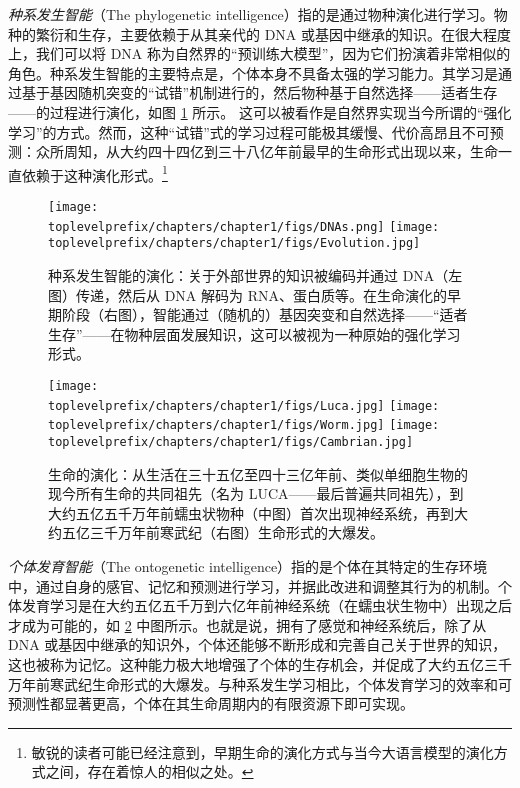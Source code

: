 \documentclass[../../book-main.tex]{subfiles}
\begin{document}
{\em 种系发生智能}（The phylogenetic intelligence）指的是通过物种演化进行学习。物种的繁衍和生存，主要依赖于从其亲代的 DNA 或基因中继承的知识。在很大程度上，我们可以将 DNA 称为自然界的“预训练大模型”，因为它们扮演着非常相似的角色。种系发生智能的主要特点是，个体本身不具备太强的学习能力。其学习是通过基于基因随机突变的“试错”机制进行的，然后物种基于自然选择——适者生存——的过程进行演化，如图 \ref{fig:phylogenetic} 所示。
这可以被看作是自然界实现当今所谓的“强化学习”的方式。然而，这种“试错”式的学习过程可能极其缓慢、代价高昂且不可预测：众所周知，从大约四十四亿到三十八亿年前最早的生命形式出现以来，生命一直依赖于这种演化形式。\footnote{敏锐的读者可能已经注意到，早期生命的演化方式与当今大语言模型的演化方式之间，存在着惊人的相似之处。} 
\begin{figure}
    \centering
\texttt{[image: \\toplevelprefix/chapters/chapter1/figs/DNAs.png]}
\texttt{[image: \\toplevelprefix/chapters/chapter1/figs/Evolution.jpg]}
    \caption{种系发生智能的演化：关于外部世界的知识被编码并通过 DNA（左图）传递，然后从 DNA 解码为 RNA、蛋白质等。在生命演化的早期阶段（右图），智能通过（随机的）基因突变和自然选择——“适者生存”——在物种层面发展知识，这可以被视为一种原始的强化学习形式。}
    \label{fig:phylogenetic}
\end{figure}
\begin{figure}
    \centering
\texttt{[image: \\toplevelprefix/chapters/chapter1/figs/Luca.jpg]}
\texttt{[image: \\toplevelprefix/chapters/chapter1/figs/Worm.jpg]}
\texttt{[image: \\toplevelprefix/chapters/chapter1/figs/Cambrian.jpg]}
    \caption{生命的演化：从生活在三十五亿至四十三亿年前、类似单细胞生物的现今所有生命的共同祖先（名为 LUCA——最后普遍共同祖先），到大约五亿五千万年前蠕虫状物种（中图）首次出现神经系统，再到大约五亿三千万年前寒武纪（右图）生命形式的大爆发。}
    \label{fig:evolution}
\end{figure}

{\em 个体发育智能}（The ontogenetic intelligence）指的是个体在其特定的生存环境中，通过自身的感官、记忆和预测进行学习，并据此改进和调整其行为的机制。个体发育学习是在大约五亿五千万到六亿年前神经系统（在蠕虫状生物中）出现之后才成为可能的，如 \ref{fig:evolution} 中图所示。也就是说，拥有了感觉和神经系统后，除了从 DNA 或基因中继承的知识外，个体还能够不断形成和完善自己关于世界的知识，这也被称为记忆。这种能力极大地增强了个体的生存机会，并促成了大约五亿三千万年前寒武纪生命形式的大爆发。与种系发生学习相比，个体发育学习的效率和可预测性都显著更高，个体在其生命周期内的有限资源下即可实现。
\end{document}
